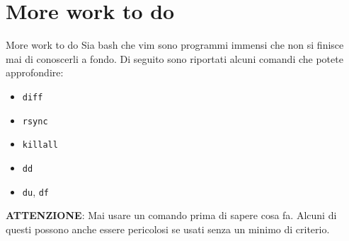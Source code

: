\section{More work to do}
\begin{frame}{More work to do}
  Sia bash che vim sono programmi immensi che non si finisce mai di conoscerli a
  fondo. Di seguito sono riportati alcuni comandi che potete approfondire: 
  \medskip
  \begin{itemize}
    \item \texttt{diff}
    \item \texttt{rsync}
    \item \texttt{killall}
    \item \texttt{dd}
    \item \texttt{du}, \texttt{df}
  \end{itemize}
  \textbf{ATTENZIONE}: Mai usare un comando prima di sapere cosa fa. Alcuni di questi
  possono anche essere pericolosi se usati senza un minimo di criterio.
\end{frame}


